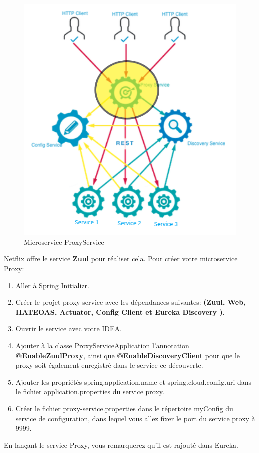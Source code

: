     \begin{figure}[H]
    	\centering
    	\includegraphics[width=0.5\linewidth]{images/tp05}
    	\caption{Microservice ProxyService}
    	\label{fig:tp05}
    \end{figure}
    
    Netflix offre le service \textbf{Zuul} pour réaliser cela. Pour créer votre microservice Proxy:
    \begin{enumerate}
\item    Aller à Spring Initializr.
\item     Créer le projet proxy-service avec les dépendances suivantes: \textbf{(Zuul, Web, HATEOAS, Actuator, Config Client et Eureka Discovery )}.
\item     Ouvrir le service avec votre  IDEA.
\item     Ajouter à la classe ProxyServiceApplication l'annotation \textbf{@EnableZuulProxy}, ainsi que \textbf{@EnableDiscoveryClient} pour que le proxy soit également enregistré dans le service ce découverte.
\item     Ajouter les propriétés spring.application.name et spring.cloud.config.uri dans le fichier application.properties du service proxy.
\item     Créer le fichier proxy-service.properties dans le répertoire myConfig du service de configuration, dans lequel vous allez fixer le port du service proxy à 9999.
 \end{enumerate}


En lançant le service Proxy, vous remarquerez qu'il est rajouté dans Eureka.
    
    
    
